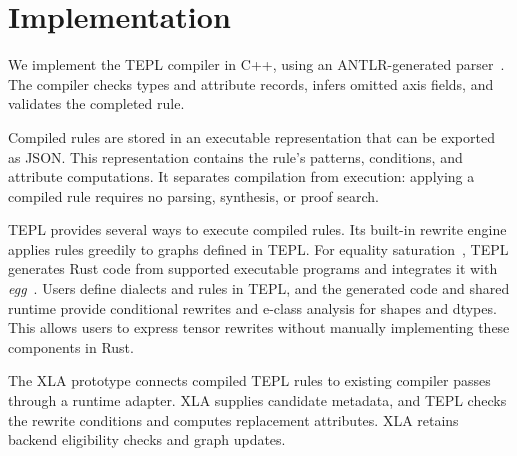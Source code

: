 \section{Implementation}
\label{sec:implementation}
We implement the TEPL compiler in C++, using an ANTLR-generated
parser~\cite{antlr}. The compiler checks types and attribute records,
infers omitted axis fields, and validates the completed rule.

Compiled rules are stored in an executable representation that can
be exported as JSON. This representation contains the rule's patterns,
conditions, and attribute computations. It separates compilation from
execution: applying a compiled rule requires no parsing, synthesis,
or proof search.

TEPL provides several ways to execute compiled rules. Its built-in
rewrite engine applies rules greedily to graphs defined in TEPL.
For equality saturation~\cite{equality-saturation}, TEPL generates
Rust code from supported executable programs and integrates it with
\emph{egg}~\cite{egg}. Users define dialects and rules in TEPL, and
the generated code and shared runtime provide conditional rewrites
and e-class analysis for shapes and dtypes. This allows users to
express tensor rewrites without manually implementing these
components in Rust.

The XLA prototype connects compiled TEPL rules to existing compiler
passes through a runtime adapter. XLA supplies candidate metadata,
and TEPL checks the rewrite conditions and computes replacement
attributes. XLA retains backend eligibility checks and graph updates.

